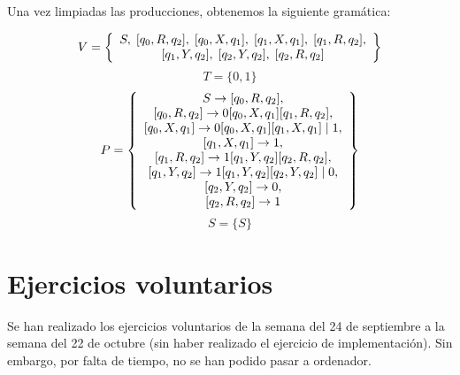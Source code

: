 \documentclass[11pt,a4paper]{article}
\begin{document}
		
		Una vez limpiadas las producciones, obtenemos la siguiente gramática:
		
		\[V = \left\{
			  \begin{array}{c}
			  		S, \; [q_0, R, q_2], \; [q_0, X, q_1], \; [q_1, X, q_1], \; [q_1, R, q_2], \\ \relax
			  		[q_1, Y, q_2], \; [q_2, Y, q_2], \; [q_2, R, q_2]
			  \end{array}
			  \right\}
		\]
		\[T = \{ 0, 1 \}\]
		\[P = \left\{
			  \begin{array}{c}
			  		S \rightarrow [q_0, R, q_2], \\ \relax
			  		[q_0, R, q_2] \rightarrow 0[q_0, X, q_1][q_1, R, q_2], \\ \relax
			  		[q_0, X, q_1] \rightarrow 0[q_0, X, q_1][q_1, X, q_1] \; | \; 1, \\ \relax
			  		[q_1, X, q_1] \rightarrow 1, \\ \relax
			  		[q_1, R, q_2] \rightarrow 1[q_1, Y, q_2][q_2, R, q_2], \\ \relax
			  		[q_1, Y, q_2] \rightarrow 1[q_1, Y, q_2][q_2, Y, q_2] \; | \; 0, \\ \relax
			  		[q_2, Y, q_2] \rightarrow 0, \\ \relax
			  		[q_2, R, q_2] \rightarrow 1
			  		
			  \end{array}
			  \right\}			   
		\]
		\[S = \{ S \} \]
		
	\newpage
	\section{Ejercicios voluntarios}
	
	Se han realizado los ejercicios voluntarios de la semana del 24 de septiembre a la semana del 22 de octubre (sin haber
	realizado el ejercicio de implementación). Sin embargo, por falta de tiempo, no se han podido pasar a ordenador.
	
\end{document}
